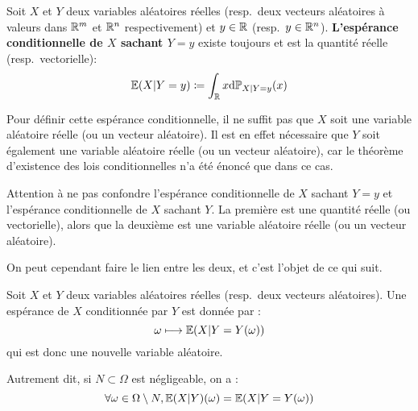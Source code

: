 \documentclass[../integ-proba.tex]{subfiles}
\begin{document}
    \begin{defi}
        Soit $X$ et $Y$ deux variables aléatoires réelles (resp.\ deux vecteurs aléatoires à valeurs dans $\mathbb{R}^m$ et $\mathbb{R}^n$ respectivement) et $y \in \mathbb{R}$ (resp.\ $y \in \mathbb{R}^n$).
        \textbf{L'espérance conditionnelle de $X$ sachant $Y = y$} existe toujours et est la quantité réelle (resp.\ vectorielle):
        \begin{displaymath}
            \mathbb{E}(X | Y = y) \coloneqq \int_{\mathbb{R}} x \textnormal{d} \mathbb{P}_{X | Y=y}(x)
        \end{displaymath}
    \end{defi}

    \begin{rem}
        Pour définir cette espérance conditionnelle, il ne suffit pas que $X$ soit une variable aléatoire réelle (ou un vecteur aléatoire).
        Il est en effet nécessaire que $Y$ soit également une variable aléatoire réelle (ou un vecteur aléatoire), car le théorème d'existence des lois conditionnelles n'a été énoncé que dans ce cas.
    \end{rem}

    \begin{rem}
        Attention à ne pas confondre l'espérance conditionnelle de $X$ sachant $Y = y$ et l'espérance conditionnelle de $X$ sachant $Y$.
        La première est une quantité réelle (ou vectorielle), alors que la deuxième est une variable aléatoire réelle (ou un vecteur aléatoire).

        On peut cependant faire le lien entre les deux, et c'est l'objet de ce qui suit.
    \end{rem}

    \begin{thm}
        Soit $X$ et $Y$ deux variables aléatoires réelles (resp.\ deux vecteurs aléatoires).
        Une espérance de $X$ conditionnée par $Y$ est donnée par :
        \begin{displaymath}
            \omega \longmapsto \mathbb{E}(X | Y = Y(\omega))
        \end{displaymath}
        qui est donc une nouvelle variable aléatoire.

        Autrement dit, si $N \subset \Omega$ est négligeable, on a :
        \begin{displaymath}
            \forall \omega \in \Omega \setminus N, \mathbb{E}(X | Y)(\omega) = \mathbb{E}(X | Y = Y(\omega))
        \end{displaymath}
    \end{thm}
\end{document}

